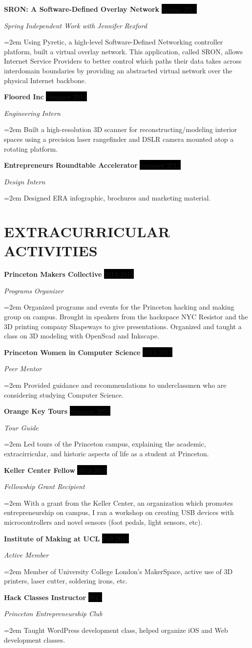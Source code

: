 \documentclass[paper=a4,fontsize=11pt]{scrartcl} %
\newcommand{\sepspace}{\vspace*{1em}}		%
\newcommand{\NewPart}[1]{\section*{\uppercase{#1}}}
\newcommand{\EducationEntry}[4]{
		\noindent \textbf{#1} \hfill      %
		\colorbox{Black}{%
			\parbox{6em}{%
			\hfill\color{White}#2}} \par  %
		\noindent \textit{#3} \par        %
		\noindent\hangindent=2em\hangafter=0 \small #4 %
		\normalsize \par}
\newcommand{\WorkEntry}[4]{				  %
		\noindent \textbf{#1} \hfill      %
		\colorbox{Black}{\color{White}#2} \par  %
		\noindent \textit{#3} \par              %
		\noindent\hangindent=2em\hangafter=0 \small #4 %
		\normalsize \par}
\begin{document}
\WorkEntry{SRON: A Software-Defined Overlay Network}{Spring 2014}{Spring Independent Work with Jennifer Rexford}{
	Using Pyretic, a high-level Software-Defined Networking controller 
	platform, built a virtual overlay network.  This application, called SRON, allows Internet Service Providers to better control
	which paths their data takes across interdomain boundaries by providing
	an abstracted virtual network over the physical Internet backbone.
}
\sepspace

\WorkEntry{Floored Inc}{Summer 2013}{Engineering Intern}{
	Built a high-resolution 3D scanner for reconstructing/modeling interior spaces using a precision laser rangefinder and DSLR camera mounted atop a rotating platform.
}
\sepspace

\WorkEntry{Entrepreneurs Roundtable Accelerator}{Summer 2012}{Design Intern}{Designed ERA infographic, brochures and marketing material.  }


\NewPart{Extracurricular Activities}{}

\WorkEntry{Princeton Makers Collective}{2013-2015}{Programs Organizer}{
	Organized programs and events for the Princeton hacking and making group on campus.  Brought in speakers from the hackspace NYC Resistor and the 3D printing company Shapeways to give presentations.  Organized and taught a class on 3D modeling with OpenScad and Inkscape.
}
\sepspace

\WorkEntry{Princeton Women in Computer Science}{2014-2015}{Peer Mentor}{
	Provided guidance and recommendations to underclassmen who are considering studying Computer Science.
}
\sepspace

\WorkEntry{Orange Key Tours}{Summer 2014}{Tour Guide}{
	Led tours of the Princeton campus, explaining the academic, extracirricular, and historic aspects of life as a student at Princeton.
}
\sepspace

\WorkEntry{Keller Center Fellow}{2014-2015}{Fellowship Grant Recipient}{
	With a grant from the Keller Center, an organization which promotes entrepreneurship on campus, I ran a workshop on creating USB devices with microcontrollers and novel sensors (foot pedals, light sensors, etc).
}
\sepspace

\WorkEntry{Institute of Making at UCL}{Fall 2013}{Active Member}{
	Member of University College London's MakerSpace, active use of 3D printers, laser cutter, soldering irons, etc.
}
\sepspace

\WorkEntry{Hack Classes Instructor}{2013}{Princeton Entrepreneurship Club}{
	Taught WordPress development class, helped organize iOS and Web development classes.
}
\sepspace
\end{document}
